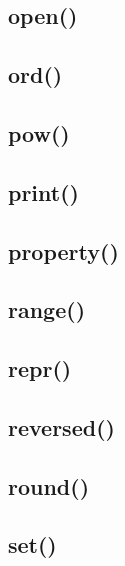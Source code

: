 \documentclass{article}
\begin{document}
\subsection{open()}
%

\subsection{ord()}
%

\subsection{pow()}
%

\subsection{print()}
%

\subsection{property()}
%

\subsection{range()}
%

\subsection{repr()}
%

\subsection{reversed()}
%

\subsection{round()}
%

\subsection{set()}
%
\end{document}
